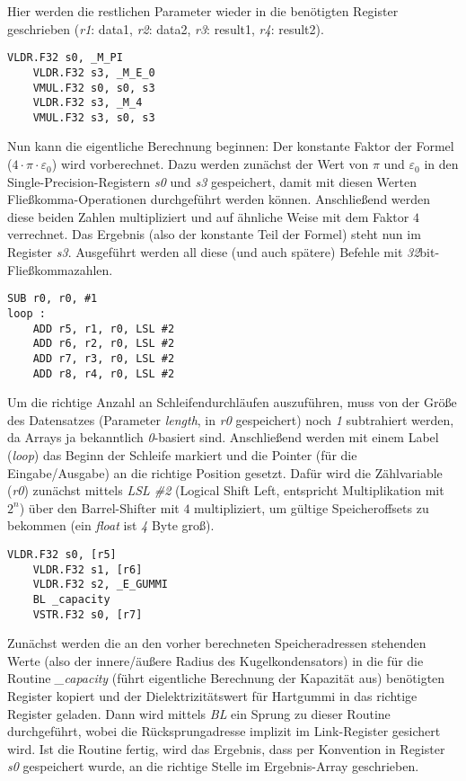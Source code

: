 \documentclass[11pt]{scrartcl}
\begin{document}
Hier werden die restlichen Parameter wieder in die benötigten Register geschrieben (\emph{r1}: data1, \emph{r2}: data2, \emph{r3}: result1, \emph{r4}: result2).
\\
\begin{lstlisting}[language={[x86masm]Assembler}]
	VLDR.F32 s0, _M_PI
	VLDR.F32 s3, _M_E_0
	VMUL.F32 s0, s0, s3
	VLDR.F32 s3, _M_4
	VMUL.F32 s3, s0, s3
\end{lstlisting}
Nun kann die eigentliche Berechnung beginnen: Der konstante Faktor der Formel ($4 \cdot \pi \cdot \varepsilon_{0}$) wird vorberechnet. Dazu werden zunächst der Wert von $\pi$ und $\varepsilon_{0}$ in den Single-Precision-Registern \emph{s0} und \emph{s3} gespeichert, damit mit diesen Werten Fließkomma-Operationen durchgeführt werden können. Anschließend werden diese beiden Zahlen multipliziert und auf ähnliche Weise mit dem Faktor $4$ verrechnet. Das Ergebnis (also der konstante Teil der Formel) steht nun im Register \emph{s3}. Ausgeführt werden all diese (und auch spätere) Befehle mit \emph{32}bit-Fließkommazahlen.
\\
\begin{lstlisting}[language={[x86masm]Assembler}]
	SUB r0, r0, #1
loop :
	ADD r5, r1, r0, LSL #2
	ADD r6, r2, r0, LSL #2
	ADD r7, r3, r0, LSL #2
	ADD r8, r4, r0, LSL #2
\end{lstlisting}
Um die richtige Anzahl an Schleifendurchläufen auszuführen, muss von der Größe des Datensatzes (Parameter \emph{length}, in \emph{r0} gespeichert) noch \emph{1} subtrahiert werden, da Arrays ja bekanntlich \emph{0}-basiert sind. Anschließend werden mit einem Label (\emph{loop}) das Beginn der Schleife markiert und die Pointer (für die Eingabe/Ausgabe) an die richtige Position gesetzt. Dafür wird die Zählvariable (\emph{r0}) zunächst mittels \emph{LSL \#2} (Logical Shift Left, entspricht Multiplikation mit $2^{n}$) über den Barrel-Shifter mit $4$ multipliziert, um gültige Speicheroffsets zu bekommen (ein \emph{float} ist \emph{4} Byte groß).
\\
\begin{lstlisting}[language={[x86masm]Assembler}]
	VLDR.F32 s0, [r5]
	VLDR.F32 s1, [r6]
	VLDR.F32 s2, _E_GUMMI
	BL _capacity
	VSTR.F32 s0, [r7]
\end{lstlisting}
Zunächst werden die an den vorher berechneten Speicheradressen stehenden Werte (also der innere/äußere Radius des Kugelkondensators) in die für die Routine \emph{\_capacity} (führt eigentliche Berechnung der Kapazität aus) benötigten Register kopiert und der Dielektrizitätswert für Hartgummi in das richtige Register geladen. Dann wird mittels \emph{BL} ein Sprung zu dieser Routine durchgeführt, wobei die Rücksprungadresse implizit im Link-Register gesichert wird. Ist die Routine fertig, wird das Ergebnis, dass per Konvention in Register \emph{s0} gespeichert wurde, an die richtige Stelle im Ergebnis-Array geschrieben.
\end{document}

